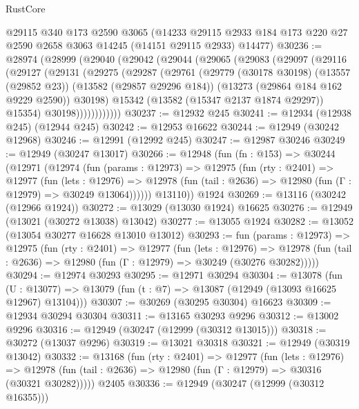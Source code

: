 \begin{lexlean}{RustCore}
\begin{coremodule}
    @29115
    @340
    @173
    @2590
    @3065
    (@14233 @29115 @2933 @184 @173 @220 @27 @2590 @2658 @3063 @14245 (@14151 @29115 @2933) @14477)
@30236 := @28974
    (@28999
      (@29040
        (@29042
          (@29044
            (@29065
              (@29083
                (@29097
                  (@29116
                    (@29127
                      (@29131
                        (@29275
                          (@29287
                            (@29761
                              (@29779
                                (@30178 @30198)
                                (@13557 (@29852 @23))
                                (@13582 (@29857 @29296 @184))
                                (@13273 (@29864 @184 @162 @9229 @2590))
                                @30198)
                              @15342
                              (@13582 (@15347 @2137 @1874 @29297))
                              @15354)
                            @30198))))))))))))
@30237 := @12932 @245
@30241 := @12934 (@12938 @245) (@12944 @245)
@30242 := @12953 @16622
@30244 := @12949 (@30242 @12968)
@30246 := @12991 (@12992 @245)
@30247 := @12987 @30246
@30249 := @12949 (@30247 @13017)
@30266 := @12948
    (fun (fn : @153) =>
    @30244
      (@12971
        (@12974
          (fun (params : @12973) =>
          @12975
            (fun (rty : @2401) =>
            @12977
              (fun (lets : @12976) =>
              @12978 (fun (tail : @2636) => @12980 (fun (Γ : @12979) => @30249 @13064))))))
        @13110))
    @1924
@30269 := @13116 (@30242 (@12966 @1924))
@30272 := @13029 (@13030 @1924) @16625
@30276 := @12949 (@13021 (@30272 @13038) @13042)
@30277 := @13055 @1924
@30282 := @13052 (@13054 @30277 @16628 @13010 @13012)
@30293 := fun (params : @12973) =>
  @12975
    (fun (rty : @2401) =>
    @12977
      (fun (lets : @12976) =>
      @12978 (fun (tail : @2636) => @12980 (fun (Γ : @12979) => @30249 (@30276 @30282)))))
@30294 := @12974 @30293
@30295 := @12971 @30294
@30304 := @13078
    (fun (U : @13077) => @13079 (fun (t : @7) => @13087 (@12949 (@13093 @16625 @12967) @13104)))
@30307 := @30269 (@30295 @30304) @16623
@30309 := @12934 @30294 @30304
@30311 := @13165 @30293 @9296
@30312 := @13002 @9296
@30316 := @12949 (@30247 (@12999 (@30312 @13015)))
@30318 := @30272 (@13037 @9296)
@30319 := @13021 @30318
@30321 := @12949 (@30319 @13042)
@30332 := @13168
    (fun (rty : @2401) =>
    @12977
      (fun (lets : @12976) =>
      @12978 (fun (tail : @2636) => @12980 (fun (Γ : @12979) => @30316 (@30321 @30282)))))
    @2405
@30336 := @12949 (@30247 (@12999 (@30312 @16355)))

\end{coremodule}
\end{lexlean}
